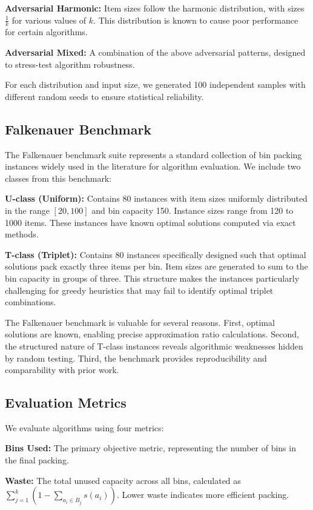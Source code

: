 \documentclass[11pt,a4paper]{article}
\begin{document}
\textbf{Adversarial Harmonic:} Item sizes follow the harmonic distribution, with sizes $\frac{1}{k}$ for various values of $k$. This distribution is known to cause poor performance for certain algorithms.

\textbf{Adversarial Mixed:} A combination of the above adversarial patterns, designed to stress-test algorithm robustness.

For each distribution and input size, we generated 100 independent samples with different random seeds to ensure statistical reliability.

\subsection{Falkenauer Benchmark}

The Falkenauer benchmark suite represents a standard collection of bin packing instances widely used in the literature for algorithm evaluation. We include two classes from this benchmark:

\textbf{U-class (Uniform):} Contains 80 instances with item sizes uniformly distributed in the range $[20, 100]$ and bin capacity 150. Instance sizes range from 120 to 1000 items. These instances have known optimal solutions computed via exact methods.

\textbf{T-class (Triplet):} Contains 80 instances specifically designed such that optimal solutions pack exactly three items per bin. Item sizes are generated to sum to the bin capacity in groups of three. This structure makes the instances particularly challenging for greedy heuristics that may fail to identify optimal triplet combinations.

The Falkenauer benchmark is valuable for several reasons. First, optimal solutions are known, enabling precise approximation ratio calculations. Second, the structured nature of T-class instances reveals algorithmic weaknesses hidden by random testing. Third, the benchmark provides reproducibility and comparability with prior work.

\subsection{Evaluation Metrics}

We evaluate algorithms using four metrics:

\textbf{Bins Used:} The primary objective metric, representing the number of bins in the final packing.

\textbf{Waste:} The total unused capacity across all bins, calculated as $\sum_{j=1}^{k}(1 - \sum_{a_i \in B_j} s(a_i))$. Lower waste indicates more efficient packing.
\end{document}
